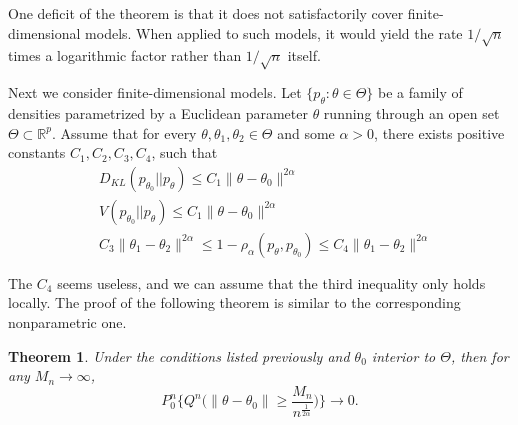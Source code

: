\documentclass[3p]{elsarticle}
\theoremstyle{plain}
\newtheorem{theorem}{\quad\quad Theorem}
\theoremstyle{definition}
\theoremstyle{remark}
\begin{document}
One deficit of the theorem is that it does not satisfactorily cover finite-dimensional models.
When applied to such models, it would yield the rate $1/\sqrt{n}$ times a logarithmic factor rather than $1/\sqrt{n}$ itself.

Next we consider finite-dimensional models.
Let $\{p_{\theta}: \theta\in \Theta\}$ be a family of densities parametrized by a Euclidean parameter $\theta$ running through an open set $\Theta\subset \mathbb{R}^p$. 
Assume that for every $\theta, \theta_1,\theta_2 \in \Theta$ and some $\alpha>0$,
there exists positive constants $C_1,C_2,C_3,C_4$, such that
$$
\begin{aligned}
    &D_{KL}(p_{\theta_0} || p_{\theta})\leq C_1 \|\theta-\theta_0\|^{2\alpha}\\
    &V(p_{\theta_0} || p_{\theta})\leq C_1 \|\theta-\theta_0\|^{2\alpha}\\
    &C_3 \|\theta_1-\theta_2\|^{2\alpha}\leq 1-\rho_{\alpha}(p_{\theta} , p_{\theta_0})\leq C_4 \|\theta_1-\theta_2\|^{2\alpha}\\
    &\\
\end{aligned}
$$
The $C_4$ seems useless, and we can assume that the third inequality only holds locally.
The proof of the following theorem is similar to the corresponding nonparametric one.
\begin{theorem}
    Under the conditions listed previously and $\theta_0$ interior to $\Theta$, then for any $M_n\to \infty$,
    $$
    P_0^n \Big\{ Q^n \big( \|\theta-\theta_0\|\geq \frac{M_n}{n^{\frac{1}{2\alpha}}}\big)\Big\}
    \to  0
    .
    $$
\end{theorem}
\end{document}
